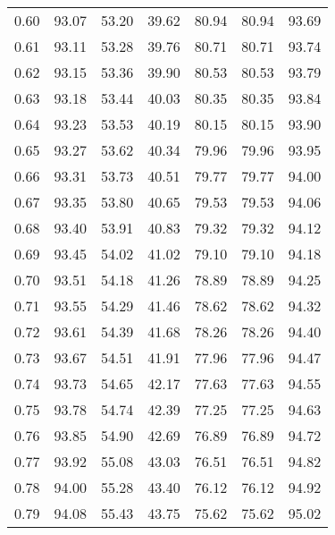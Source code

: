 \begin{tabular}{|c|c|c|c|c|c|c|}
      0.60 &     93.07 &     53.20 &      39.62 &   80.94 &      80.94 &         93.69 \\
      0.61 &     93.11 &     53.28 &      39.76 &   80.71 &      80.71 &         93.74 \\
      0.62 &     93.15 &     53.36 &      39.90 &   80.53 &      80.53 &         93.79 \\
      0.63 &     93.18 &     53.44 &      40.03 &   80.35 &      80.35 &         93.84 \\
      0.64 &     93.23 &     53.53 &      40.19 &   80.15 &      80.15 &         93.90 \\
      0.65 &     93.27 &     53.62 &      40.34 &   79.96 &      79.96 &         93.95 \\
      0.66 &     93.31 &     53.73 &      40.51 &   79.77 &      79.77 &         94.00 \\
      0.67 &     93.35 &     53.80 &      40.65 &   79.53 &      79.53 &         94.06 \\
      0.68 &     93.40 &     53.91 &      40.83 &   79.32 &      79.32 &         94.12 \\
      0.69 &     93.45 &     54.02 &      41.02 &   79.10 &      79.10 &         94.18 \\
      0.70 &     93.51 &     54.18 &      41.26 &   78.89 &      78.89 &         94.25 \\
      0.71 &     93.55 &     54.29 &      41.46 &   78.62 &      78.62 &         94.32 \\
      0.72 &     93.61 &     54.39 &      41.68 &   78.26 &      78.26 &         94.40 \\
      0.73 &     93.67 &     54.51 &      41.91 &   77.96 &      77.96 &         94.47 \\
      0.74 &     93.73 &     54.65 &      42.17 &   77.63 &      77.63 &         94.55 \\
      0.75 &     93.78 &     54.74 &      42.39 &   77.25 &      77.25 &         94.63 \\
      0.76 &     93.85 &     54.90 &      42.69 &   76.89 &      76.89 &         94.72 \\
      0.77 &     93.92 &     55.08 &      43.03 &   76.51 &      76.51 &         94.82 \\
      0.78 &     94.00 &     55.28 &      43.40 &   76.12 &      76.12 &         94.92 \\
      0.79 &     94.08 &     55.43 &      43.75 &   75.62 &      75.62 &         95.02 \\

\end{tabular}
